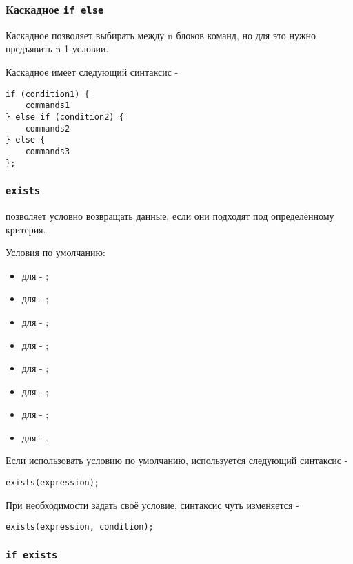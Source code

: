\documentclass[a4paper, 14pt]{extarticle}
\newenvironment{icItems}
	{ \begin{itemize} [noitemsep,nolistsep] }
	{ \end{itemize} }
\begin{document}
\subsubsection{Каскадное \lstinline`if else`}

Каскадное  позволяет выбирать между n блоков команд, но для это нужно предъявить n-1 условии.

Каскадное  имеет следующий синтаксис -
\begin{lstlisting}[numbers=none]
if (condition1) {
	commands1
} else if (condition2) {
	commands2
} else {
	commands3
};
\end{lstlisting}

\subsubsection{\lstinline`exists`}

 позволяет условно возвращать данные, если они подходят под определённому критерия.

Условия по умолчанию:
\begin{icItems}
\item
	для \bool{} - ;
\item
	для \integer{} - ;
\item
	для \double{} - ;
\item
	для \str{} - ;
\item
	для \listtype{} - ;
\item
	для \set{} - ;
\item
	для \request{} - ;
\item
	для \element{} - .
\end{icItems}

Если использовать условию по умолчанию, используется следующий синтаксис -
\begin{lstlisting}[numbers=none]
exists(expression);
\end{lstlisting}
При необходимости задать своё условие, синтаксис чуть изменяется -
\begin{lstlisting}[numbers=none]
exists(expression, condition);
\end{lstlisting}

\subsubsection{\lstinline`if exists`}
\end{document}
